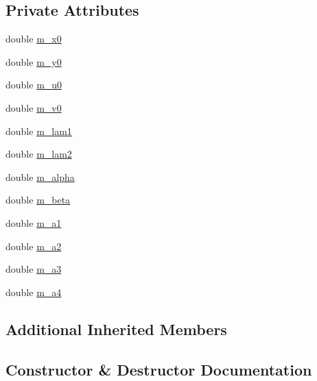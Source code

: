 \subsection*{Private Attributes}
\begin{DoxyCompactItemize}
\item 
double \hyperlink{classBallTest_afeb1bb2ce530471d5c4074d152ca701f}{m\+\_\+x0}
\item 
double \hyperlink{classBallTest_a877bd56461df54f4c78f3b94f8eb67e6}{m\+\_\+y0}
\item 
double \hyperlink{classBallTest_ab4c2f82345758982c71b88a14d6859f9}{m\+\_\+u0}
\item 
double \hyperlink{classBallTest_a878c849ee9542f2bf2ea5f0829d28be9}{m\+\_\+v0}
\item 
double \hyperlink{classBallTest_a94eb9f5afd1f7f1ff165c84c9218fd4e}{m\+\_\+lam1}
\item 
double \hyperlink{classBallTest_a40dbe9c0113bbf32ee9e494fea0f31d2}{m\+\_\+lam2}
\item 
double \hyperlink{classBallTest_a394fb47434289f2fb093e780a33b8edb}{m\+\_\+alpha}
\item 
double \hyperlink{classBallTest_a8a9b884f5ca5a780719f23673a4c6980}{m\+\_\+beta}
\item 
double \hyperlink{classBallTest_a1504b9ceaf7d2e81d5aefdb01e6d399b}{m\+\_\+a1}
\item 
double \hyperlink{classBallTest_a67d356662b8632c9c046e1ddbc25f4b1}{m\+\_\+a2}
\item 
double \hyperlink{classBallTest_ad2303667087f66f0336155d5cf2cac57}{m\+\_\+a3}
\item 
double \hyperlink{classBallTest_a0efc3aaa0721362c671a249dcbfeb499}{m\+\_\+a4}
\end{DoxyCompactItemize}
\subsection*{Additional Inherited Members}


\subsection{Constructor \& Destructor Documentation}
\mbox{\label{classBallTest_abbe9e3da5970260516dfdcdf52a280ef}} 
